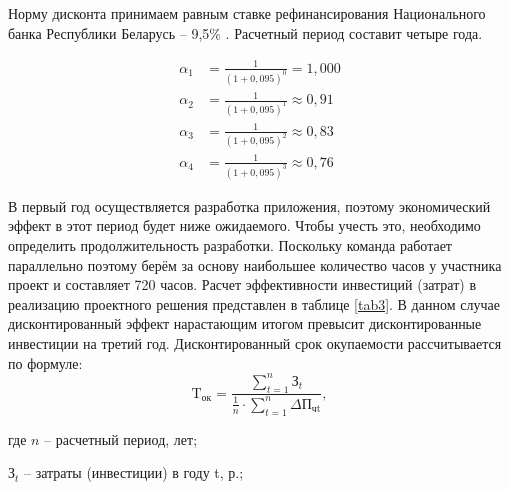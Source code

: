 Норму дисконта принимаем равным ставке рефинансирования Национального банка Республики Беларусь – 9,5\% \cite{refr}. Расчетный период составит четыре года.

\begin{equation}
	\begin{aligned}
		\alpha_1 & = \frac{1}{(1 + 0{,}095)^0} = 1{,}000      \\
		\alpha_2 & = \frac{1}{(1 + 0{,}095)^1} \approx 0{,}91 \\
		\alpha_3 & = \frac{1}{(1 + 0{,}095)^2} \approx 0{,}83 \\
		\alpha_4 & = \frac{1}{(1 + 0{,}095)^3} \approx 0{,}76
	\end{aligned}
\end{equation}

В первый год осуществляется разработка приложения, поэтому экономический эффект в этот период будет ниже ожидаемого.
Чтобы учесть это, необходимо определить продолжительность разработки. Поскольку команда работает параллельно поэтому берём за основу наибольшее количество часов у участника
проект и составляет 720 часов. Расчет эффективности инвестиций (затрат) в реализацию проектного решения представлен в таблице \ref{tab3}.
В данном случае дисконтированный эффект нарастающим итогом превысит дисконтированные инвестиции на третий год. Дисконтированный срок окупаемости рассчитывается по формуле:
\begin{equation}
\text{T}_{\text{ок}} = \frac{\sum_{t=1}^{n}{\text{З}_t}}{\frac{1}{n} \cdot \sum_{t=1}^{n} \Delta\text{П}_{\text{чt}}},
\end{equation}

где $n$ – расчетный период, лет;

$\text{З}_t$ – затраты (инвестиции) в году t, р.;

